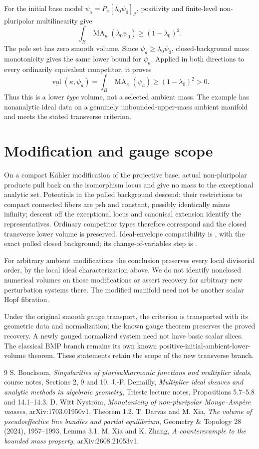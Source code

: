 \documentclass[11pt]{article}
\newcommand{\MA}{\operatorname{MA}}
\newcommand{\PI}[2]{P_{#1}[#2]_{\mathcal I}}
\begin{document}
For the initial base model $\psi_a=\PI{\kappa}{\lambda_0\psi_0}$,
positivity and finite-level non-pluripolar multilinearity give
\[
 \int_B\MA_\kappa(\lambda_0\psi_0)\geq(1-\lambda_0)^2.
\]
The pole set has zero smooth volume. Since $\psi_a\geq\lambda_0\psi_0$,
closed-background mass monotonicity \cite[Theorem 1.2]{WN} gives the
same lower bound for $\psi_a$. Applied in both directions to every
ordinarily equivalent competitor, it proves
\[
 \underline{\operatorname{vol}}(\kappa,\psi_a)
 =\int_B\MA_\kappa(\psi_a)\geq(1-\lambda_0)^2>0.
\]
Thus this is a lower \emph{type} volume, not a selected ambient mass.
The example has nonanalytic ideal data on a genuinely unbounded-upper-mass
ambient manifold and meets the stated transverse criterion.

\section{Modification and gauge scope}
On a compact K\"ahler modification of the projective base, actual
non-pluripolar products pull back on the isomorphism locus and give no
mass to the exceptional analytic set. Potentials in the pulled background
descend: their restrictions to compact connected fibers are psh and
constant, possibly identically minus infinity; descent off the exceptional
locus and canonical extension identify the representatives. Ordinary
competitor types therefore correspond and the closed transverse lower
volume is preserved. Ideal-envelope compatibility is
\cite[Lemma 3.1]{DX}, with the exact pulled closed background; its
change-of-variables step is \cite[Proposition 5.8]{Dem}.

For arbitrary ambient modifications the conclusion preserves every local
divisorial order, by the local ideal characterization above. We do not
identify nonclosed numerical volumes on those modifications or assert
recovery for arbitrary new perturbation systems there. The modified
manifold need not be another scalar Hopf fibration.

Under the original smooth gauge transport, the criterion is transported
with its geometric data and normalization; the known gauge theorem
preserves the proved recovery. A newly gauged normalized system need not
have basic scalar slices. The classical BMP branch remains its own known
positive-initial-ambient-lower-volume theorem. These statements retain
the scope of the new transverse branch.

\begin{thebibliography}{9}
 S. Boucksom,
\emph{Singularities of plurisubharmonic functions and multiplier ideals},
course notes, Sections 2, 9 and 10.
 J.-P. Demailly,
\emph{Multiplier ideal sheaves and analytic methods in algebraic geometry},
Trieste lecture notes, Propositions 5.7--5.8 and 14.1--14.3.
 D. Witt Nystr\"om,
\emph{Monotonicity of non-pluripolar Monge--Amp\`ere masses},
arXiv:1703.01950v1, Theorem 1.2.
 T. Darvas and M. Xia,
\emph{The volume of pseudoeffective line bundles and partial equilibrium},
Geometry \& Topology 28 (2024), 1957--1993, Lemma 3.1.
 M. Xia and K. Zhang,
\emph{A counterexample to the bounded mass property},
arXiv:2608.21053v1.
\end{thebibliography}
\end{document}
